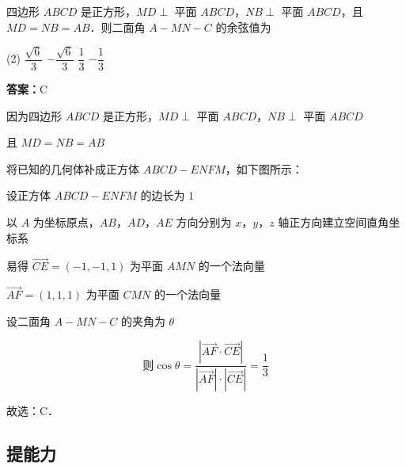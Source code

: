 \begin{example}[\bkstar{3}{5}]
四边形 $ABCD$ 是正方形，$MD\perp$ 平面 $ABCD$，$NB\perp$ 平面 $ABCD$，且 $MD=NB=AB$．则二面角 $A-MN-C$ 的余弦值为
\begin{tasks}(2)
    \task $\dfrac{\sqrt{6}}{3}$
    \task $-\dfrac{\sqrt{6}}{3}$
    \task $\dfrac{1}{3}$
    \task $-\dfrac{1}{3}$
\end{tasks}
\end{example}
\begin{solution}
\textbf{答案：}C

因为四边形 $ABCD$ 是正方形，$MD\perp$ 平面 $ABCD$，$NB\perp$ 平面 $ABCD$

且 $MD=NB=AB$

将已知的几何体补成正方体 $ABCD-ENFM$，如下图所示：

设正方体 $ABCD-ENFM$ 的边长为 $1$

以 $A$ 为坐标原点，$AB$，$AD$，$AE$ 方向分别为 $x$，$y$，$z$ 轴正方向建立空间直角坐标系

易得 $\overrightarrow{CE}=(-1,-1,1)$ 为平面 $AMN$ 的一个法向量

$\overrightarrow{AF}=(1,1,1)$ 为平面 $CMN$ 的一个法向量

设二面角 $A-MN-C$ 的夹角为 $\theta$

$$
\text{则}\cos\theta=\dfrac{\left|\overrightarrow{AF}\cdot\overrightarrow{CE}\right|}{\left|\overrightarrow{AF}\right|\cdot\left|\overrightarrow{CE}\right|}=\dfrac{1}{3}
$$

故选：C．
\end{solution}

\vspace{2em}

\subsection{提能力}

